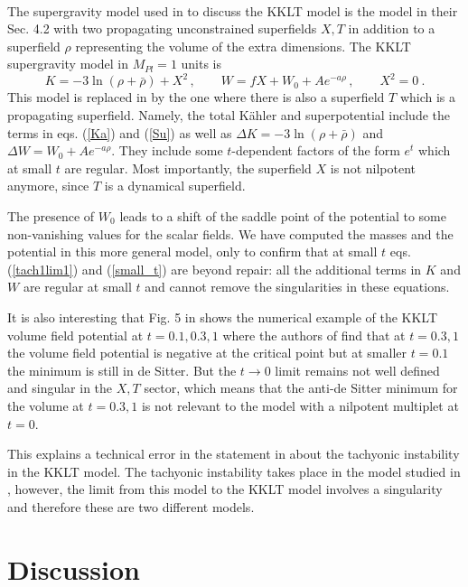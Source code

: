 \documentclass[11pt]{article}
\newcommand{\be}{\begin{equation}}
\newcommand{\ee}{\end{equation}}
\def\K{K{\"a}hler }
\newcommand{\rf}[1]{(\ref{#1})}
\def\be{\begin{equation}}
\def\ee{\end{equation}}
\begin{document}
\

The supergravity model used in \cite{DallAgata:2022abm} to discuss the KKLT model is the model in their Sec. 4.2 with two propagating unconstrained superfields $X, T$ in addition to a superfield $\rho $ representing the volume of the extra dimensions. The KKLT supergravity model in $M_{Pl}=1$ units is \cite{Ferrara:2014kva}
\be
K = -  3\ln (\rho+\bar \rho) +X^2\, ,  \qquad W= fX + W_0 + A e^{ -a\rho}\, , \qquad X^2 =0 \ .
\ee
This model is replaced in \cite{DallAgata:2022abm} by the one where there is also a superfield $T$ which is a propagating superfield. Namely, the total \K and superpotential include the terms in eqs. \rf{Ka} and \rf{Su} as well as $\Delta K = -  3\ln (\rho+\bar \rho)$ and $\Delta W= W_0 + A e^{ -a\rho}$. They include some $t$-dependent factors of the form $e^t$ which at small $t$ are  regular.
Most importantly, the superfield $X$ is not nilpotent anymore, since $T$ is a dynamical superfield.

The presence of $W_0$ leads to a shift of the saddle point of the potential to some non-vanishing values for the scalar fields. We have computed the masses and the potential in this more general model, only to confirm that at small $t$ eqs. \rf{tach1lim1} and \rf{small_t} are beyond repair: all the additional terms in $K$ and $W$ are regular at small $t$ and cannot remove the singularities in these equations. 

It is also interesting that Fig. 5 in \cite{DallAgata:2022abm} shows the numerical example of the KKLT volume field potential at $t=0.1, 0.3, 1$ where the authors of \cite{DallAgata:2022abm} find that at $t= 0.3, 1$ the volume field potential is negative at the critical point but at smaller $t=0.1$ the minimum is still in de Sitter. But the $t\to 0$ limit remains not well defined and singular in the $X,T$ sector, which means that the anti-de Sitter minimum for the volume at $t= 0.3, 1$ is not relevant to the model with a nilpotent multiplet at $t=0$.

This explains a technical error in the statement in \cite{DallAgata:2022abm} about the tachyonic instability in the KKLT model. The tachyonic instability takes place in the model studied in \cite{DallAgata:2022abm}, however, the limit from this model to the KKLT model involves a singularity and therefore these are two different models.


 

\section{Discussion}
\end{document}

